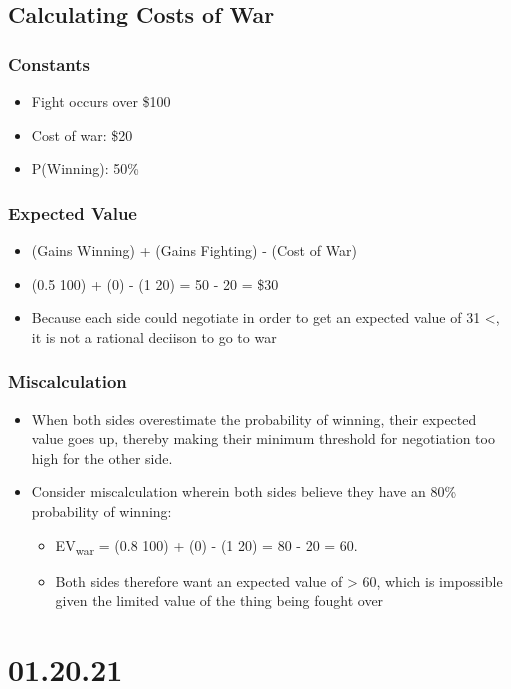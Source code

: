 \documentclass[11pt]{article}
\begin{document}
\subsection{Calculating Costs of War}
\label{sec:org1c19409}
\subsubsection{Constants}
\label{sec:org61a1c5c}
\begin{itemize}
\item Fight occurs over \$100
\item Cost of war: \$20
\item P(Winning): 50\%
\end{itemize}
\subsubsection{Expected Value}
\label{sec:org7f5b4c0}
\begin{itemize}
\item (Gains Winning) + (Gains Fighting) - (Cost of War)
\item (0.5 \texttimes{} 100) + (0) - (1 \texttimes{} 20) = 50 - 20 = \$30
\item Because each side could negotiate in order to get an expected value of 31 <, it is not a rational deciison to go to war
\end{itemize}
\subsubsection{Miscalculation}
\label{sec:org7e123bb}
\begin{itemize}
\item When both sides overestimate the probability of winning, their expected value goes up, thereby making their minimum threshold for negotiation too high for the other side.
\item Consider miscalculation wherein both sides believe they have an 80\% probability of winning:
\begin{itemize}
\item EV\textsubscript{war} = (0.8 \texttimes{} 100) + (0) - (1 \texttimes{} 20) = 80 - 20 = 60.
\item Both sides therefore want an expected value of > 60, which is impossible given the limited value of the thing being fought over
\end{itemize}
\end{itemize}
\section{01.20.21}
\label{sec:orge70ceb0}
\end{document}
